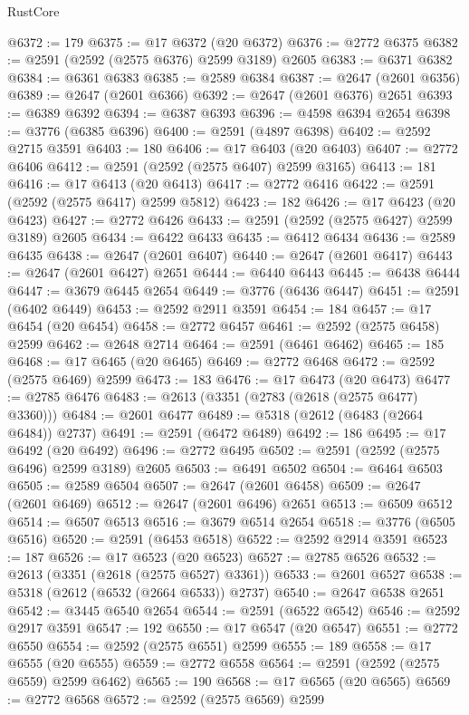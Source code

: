 \begin{lexlean}{RustCore}
\begin{coremodule}
@6372 := 179
@6375 := @17 @6372 (@20 @6372)
@6376 := @2772 @6375
@6382 := @2591 (@2592 (@2575 @6376) @2599 @3189) @2605
@6383 := @6371 @6382
@6384 := @6361 @6383
@6385 := @2589 @6384
@6387 := @2647 (@2601 @6356)
@6389 := @2647 (@2601 @6366)
@6392 := @2647 (@2601 @6376) @2651
@6393 := @6389 @6392
@6394 := @6387 @6393
@6396 := @4598 @6394 @2654
@6398 := @3776 (@6385 @6396)
@6400 := @2591 (@4897 @6398)
@6402 := @2592 @2715 @3591
@6403 := 180
@6406 := @17 @6403 (@20 @6403)
@6407 := @2772 @6406
@6412 := @2591 (@2592 (@2575 @6407) @2599 @3165)
@6413 := 181
@6416 := @17 @6413 (@20 @6413)
@6417 := @2772 @6416
@6422 := @2591 (@2592 (@2575 @6417) @2599 @5812)
@6423 := 182
@6426 := @17 @6423 (@20 @6423)
@6427 := @2772 @6426
@6433 := @2591 (@2592 (@2575 @6427) @2599 @3189) @2605
@6434 := @6422 @6433
@6435 := @6412 @6434
@6436 := @2589 @6435
@6438 := @2647 (@2601 @6407)
@6440 := @2647 (@2601 @6417)
@6443 := @2647 (@2601 @6427) @2651
@6444 := @6440 @6443
@6445 := @6438 @6444
@6447 := @3679 @6445 @2654
@6449 := @3776 (@6436 @6447)
@6451 := @2591 (@6402 @6449)
@6453 := @2592 @2911 @3591
@6454 := 184
@6457 := @17 @6454 (@20 @6454)
@6458 := @2772 @6457
@6461 := @2592 (@2575 @6458) @2599
@6462 := @2648 @2714
@6464 := @2591 (@6461 @6462)
@6465 := 185
@6468 := @17 @6465 (@20 @6465)
@6469 := @2772 @6468
@6472 := @2592 (@2575 @6469) @2599
@6473 := 183
@6476 := @17 @6473 (@20 @6473)
@6477 := @2785 @6476
@6483 := @2613 (@3351 (@2783 (@2618 (@2575 @6477) @3360)))
@6484 := @2601 @6477
@6489 := @5318 (@2612 (@6483 (@2664 @6484)) @2737)
@6491 := @2591 (@6472 @6489)
@6492 := 186
@6495 := @17 @6492 (@20 @6492)
@6496 := @2772 @6495
@6502 := @2591 (@2592 (@2575 @6496) @2599 @3189) @2605
@6503 := @6491 @6502
@6504 := @6464 @6503
@6505 := @2589 @6504
@6507 := @2647 (@2601 @6458)
@6509 := @2647 (@2601 @6469)
@6512 := @2647 (@2601 @6496) @2651
@6513 := @6509 @6512
@6514 := @6507 @6513
@6516 := @3679 @6514 @2654
@6518 := @3776 (@6505 @6516)
@6520 := @2591 (@6453 @6518)
@6522 := @2592 @2914 @3591
@6523 := 187
@6526 := @17 @6523 (@20 @6523)
@6527 := @2785 @6526
@6532 := @2613 (@3351 (@2618 (@2575 @6527) @3361))
@6533 := @2601 @6527
@6538 := @5318 (@2612 (@6532 (@2664 @6533)) @2737)
@6540 := @2647 @6538 @2651
@6542 := @3445 @6540 @2654
@6544 := @2591 (@6522 @6542)
@6546 := @2592 @2917 @3591
@6547 := 192
@6550 := @17 @6547 (@20 @6547)
@6551 := @2772 @6550
@6554 := @2592 (@2575 @6551) @2599
@6555 := 189
@6558 := @17 @6555 (@20 @6555)
@6559 := @2772 @6558
@6564 := @2591 (@2592 (@2575 @6559) @2599 @6462)
@6565 := 190
@6568 := @17 @6565 (@20 @6565)
@6569 := @2772 @6568
@6572 := @2592 (@2575 @6569) @2599

\end{coremodule}
\end{lexlean}
